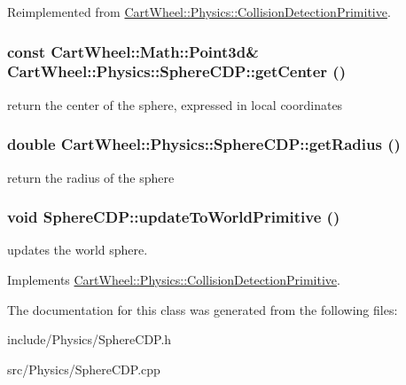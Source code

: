 Reimplemented from \hyperlink{classCartWheel_1_1Physics_1_1CollisionDetectionPrimitive_a26c85561d35a7df8bb48697da9c1cb10}{CartWheel::Physics::CollisionDetectionPrimitive}.

\hypertarget{classCartWheel_1_1Physics_1_1SphereCDP_a9a434686c5413df9bae2331ad48c3eff}{
\subsubsection[{getCenter}]{\setlength{\rightskip}{0pt plus 5cm}const {\bf CartWheel::Math::Point3d}\& CartWheel::Physics::SphereCDP::getCenter ()}}
\label{classCartWheel_1_1Physics_1_1SphereCDP_a9a434686c5413df9bae2331ad48c3eff}
return the center of the sphere, expressed in local coordinates \hypertarget{classCartWheel_1_1Physics_1_1SphereCDP_ae63b5f19aeec6882e9e6900f41c777dd}{
\subsubsection[{getRadius}]{\setlength{\rightskip}{0pt plus 5cm}double CartWheel::Physics::SphereCDP::getRadius ()}}
\label{classCartWheel_1_1Physics_1_1SphereCDP_ae63b5f19aeec6882e9e6900f41c777dd}
return the radius of the sphere \hypertarget{classCartWheel_1_1Physics_1_1SphereCDP_ad09c011967bd3207ee5797e540282894}{
\subsubsection[{updateToWorldPrimitive}]{\setlength{\rightskip}{0pt plus 5cm}void SphereCDP::updateToWorldPrimitive ()}}
\label{classCartWheel_1_1Physics_1_1SphereCDP_ad09c011967bd3207ee5797e540282894}
updates the world sphere. 

Implements \hyperlink{classCartWheel_1_1Physics_1_1CollisionDetectionPrimitive}{CartWheel::Physics::CollisionDetectionPrimitive}.



The documentation for this class was generated from the following files:\begin{DoxyCompactItemize}
\item 
include/Physics/SphereCDP.h\item 
src/Physics/SphereCDP.cpp\end{DoxyCompactItemize}
